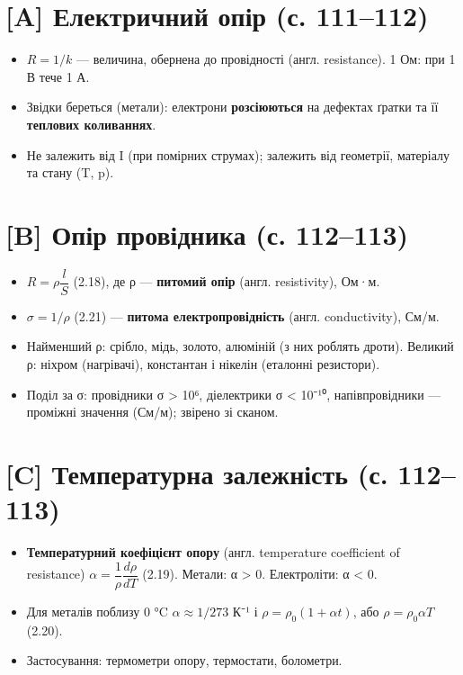 \documentclass[11pt,a4paper,oneside]{book}
\begin{document}
\section*{[A] Електричний опір (с. 111–112)}
\begin{itemize}
\item $R = 1/k$ — величина, обернена до провідності (англ. resistance). 1 Ом: при 1 В тече 1 А.
\item Звідки береться (метали): електрони \textbf{розсіюються} на дефектах ґратки та її \textbf{теплових коливаннях}.
\item Не залежить від I (при помірних струмах); залежить від геометрії, матеріалу та стану (T, p).
\end{itemize}

\section*{[B] Опір провідника (с. 112–113)}
\begin{itemize}
\item $R = \rho\dfrac{l}{S}$ (2.18), де ρ — \textbf{питомий опір} (англ. resistivity), Ом·м.
\item $\sigma = 1/\rho$ (2.21) — \textbf{питома електропровідність} (англ. conductivity), См/м.
\item Найменший ρ: срібло, мідь, золото, алюміній (з них роблять дроти). Великий ρ: ніхром (нагрівачі), константан і нікелін (еталонні резистори).
\item Поділ за σ: провідники σ > 10⁶, діелектрики σ < 10⁻¹⁰, напівпровідники — проміжні значення (См/м); звірено зі сканом.
\end{itemize}

\section*{[C] Температурна залежність (с. 112–113)}
\begin{itemize}
\item \textbf{Температурний коефіцієнт опору} (англ. temperature coefficient of resistance) $\alpha = \dfrac1\rho\dfrac{d\rho}{dT}$ (2.19). Метали: α > 0. Електроліти: α < 0.
\item Для металів поблизу 0 °C $\alpha\approx 1/273$ К⁻¹ і $\rho = \rho_0(1+\alpha t)$, або $\rho = \rho_0\alpha T$ (2.20).
\item Застосування: термометри опору, термостати, болометри.
\end{itemize}
\end{document}
